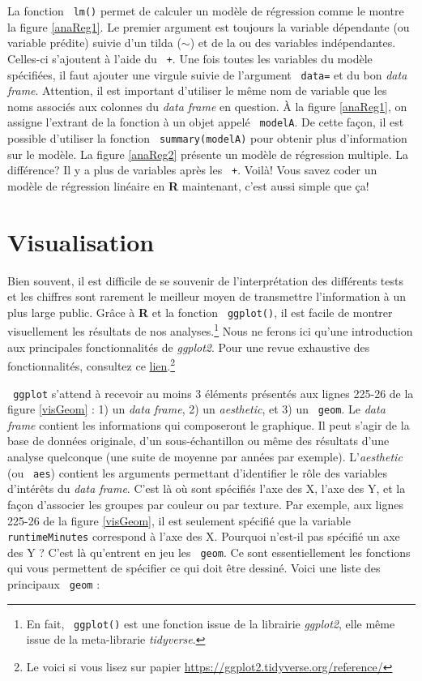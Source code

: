 \documentclass[10.5pt,a4paper]{article}
\newcommand{\rcode}[1]{\texttt{\color{rstudio} #1}}
\begin{document}
  La fonction \rcode{lm()} permet de calculer un modèle de régression comme le montre la figure \ref{anaReg1}. Le premier argument est toujours la variable dépendante (ou variable prédite) suivie d'un tilda ($\sim$) et de la ou des variables indépendantes. Celles-ci s'ajoutent à l'aide du \rcode{+}. Une fois toutes les variables du modèle spécifiées, il faut ajouter une virgule suivie de l'argument \rcode{data=} et du bon \textit{data frame}. Attention, il est important d'utiliser le même nom de variable que les noms associés aux colonnes du \textit{data frame} en question. À la figure \ref{anaReg1}, on assigne l'extrant de la fonction à un objet appelé \rcode{modelA}. De cette façon, il est possible d'utiliser la fonction \rcode{summary(modelA)} pour obtenir plus d'information sur le modèle. La figure \ref{anaReg2} présente un modèle de régression multiple. La différence? Il y a plus de variables après les \rcode{+}. Voilà! Vous savez coder un modèle de régression linéaire en \textbf{R} maintenant, c'est aussi simple que ça!  
  
  \section{Visualisation}
  Bien souvent, il est difficile de se souvenir de l'interprétation des différents tests et les chiffres sont rarement le meilleur moyen de transmettre l'information à un plus large public. Grâce à \textbf{R} et la fonction \rcode{ggplot()}, il est facile de montrer visuellement les résultats de nos analyses.\footnote{En fait, \rcode{ggplot()} est une fonction issue de la librairie \textit{ggplot2}, elle même issue de la meta-librarie \textit{tidyverse}.} Nous ne ferons ici qu'une introduction aux principales fonctionnalités de \textit{ggplot2}. Pour une revue exhaustive des fonctionnalités, consultez ce \href{https://ggplot2.tidyverse.org/reference/}{lien}.\footnote{Le voici si vous lisez sur papier \href{https://ggplot2.tidyverse.org/reference/}{https://ggplot2.tidyverse.org/reference/}}
  
  \rcode{ggplot} s'attend à recevoir au moins 3 éléments présentés aux lignes 225-26 de la figure \ref{visGeom} : 1) un \emph{data frame}, 2) un \textit{aesthetic}, et 3) un \rcode{geom}. Le \emph{data frame} contient les informations qui composeront le graphique. Il peut s'agir de la base de données originale, d'un sous-échantillon ou même des résultats d'une analyse quelconque (une suite de moyenne par années par exemple). L'\textit{aesthetic} (ou \rcode{aes}) contient les arguments permettant d'identifier le rôle des variables d'intérêts du \emph{data frame}. C'est là où sont spécifiés l'axe des X, l'axe des Y, et la façon d'associer les groupes par couleur ou par texture. Par exemple, aux lignes 225-26 de la figure \ref{visGeom}, il est seulement spécifié que la variable \rcode{runtimeMinutes} correspond à l'axe des X. Pourquoi n'est-il pas spécifié un axe des Y ? C'est là qu'entrent en jeu les \rcode{geom}. Ce sont essentiellement les fonctions qui vous permettent de spécifier ce qui doit être dessiné. Voici une liste des principaux \rcode{geom} :
  
\end{document}
